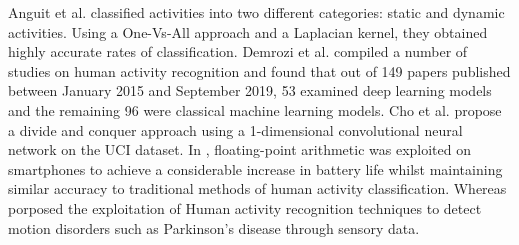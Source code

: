 Anguit et al. \cite{Anguita2012}  classified activities into two different categories: static and dynamic activities.
Using a One-Vs-All approach and a Laplacian kernel, they obtained highly accurate rates of classification.
Demrozi et al. \cite{Demrozi2020} compiled a number of studies on human activity recognition and found that out of 149 papers published between January 2015 and September 2019, 53 examined deep learning models and the remaining 96 were classical machine learning models.
Cho et al. \cite{Cho2018} propose a divide and conquer approach using a 1-dimensional convolutional neural network on the UCI dataset.
In \cite{Anguita2013EnergyES}, floating-point arithmetic was exploited on smartphones to achieve a considerable increase in battery life whilst maintaining similar accuracy to traditional methods of human activity classification.
Whereas \cite{ReyesOrtiz2013HumanAA} porposed the exploitation of Human activity recognition techniques to detect motion disorders such as Parkinson's disease through sensory data.
